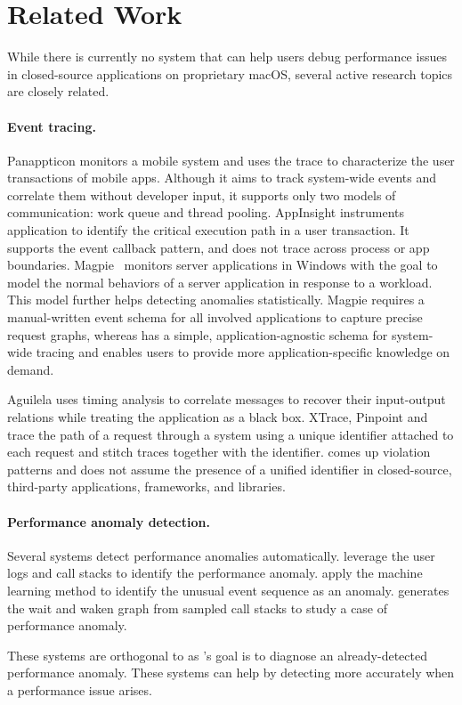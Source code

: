 \section{Related Work}
\label{sec:related-work}

While there is currently no system that can help users debug performance
issues in closed-source applications on proprietary macOS, several active
research topics are closely related.

\paragraph{Event tracing.}


Panappticon \cite{zhang2013panappticon} monitors a mobile system and uses the
trace to characterize the user transactions of mobile apps. Although it aims to
track system-wide events and correlate them without developer input, it supports
only two models of communication: work queue and thread pooling. AppInsight
\cite{ravindranath2012appinsight} instruments application to identify the
critical execution path in a user transaction. It supports the event callback
pattern, and does not trace across process or app boundaries.
Magpie~\cite{barham2004using} monitors server applications in Windows with the
goal to model the normal behaviors of a server application in response to a
workload. This model further helps detecting anomalies statistically. Magpie
requires a manual-written event schema for all involved applications to capture
precise request graphs, whereas \xxx has a simple, application-agnostic schema
for system-wide tracing and enables users to provide more application-specific
knowledge on demand.

Aguilela \cite{aguilera2003performance} uses timing analysis to correlate
messages to recover their input-output relations while treating the application
as a black box. XTrace, Pinpoint and \etc ~\cite{fonseca2007x, chen2002pinpoint,
chow2014mystery} trace the path of a request through a system using a unique
identifier attached to each request and stitch traces together with the
identifier. \xxx comes up violation patterns and does not assume the presence of
a unified identifier in closed-source, third-party applications, frameworks, and
libraries.


\paragraph{Performance anomaly detection.} Several systems detect performance
anomalies automatically. \cite{han2012performance, yuan2012conservative}
leverage the user logs and call stacks to identify the performance anomaly.
\cite{cohen2004correlating, saidi2008full, xu2009detecting, du2017deeplog}
apply the machine learning method to identify the unusual event sequence as an
anomaly. \cite{yu2014comprehending} generates the wait and waken graph from
sampled call stacks to study a case of performance anomaly.

These systems are orthogonal to \xxx as \xxx's goal is to diagnose an
already-detected performance anomaly. These systems can help \xxx by detecting
more accurately when a performance issue arises.
